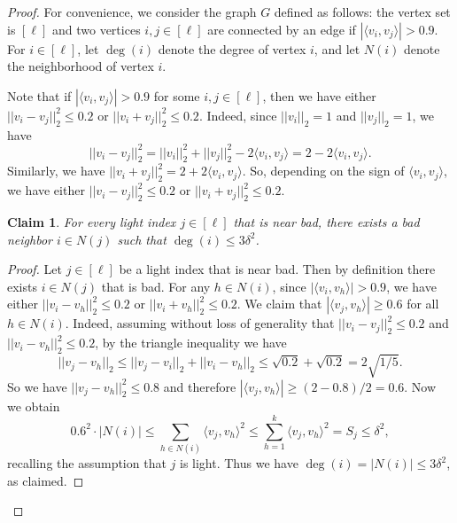 \documentclass[reqno]{amsart}
\newtheorem{claim}[theorem]{Claim}
\theoremstyle{remark}
\theoremstyle{definition}
\numberwithin{theorem}{section}
\renewcommand{\(}{\bigl(}
\renewcommand{\)}{\bigr)\vphantom{)}}
\renewcommand{\le}{\leqslant}
\renewcommand{\ge}{\geqslant}
\newcommand{\ang}[1]{\langle#1\rangle}
\begin{document}
\begin{proof}
    For convenience, we consider the graph $G$ defined as follows: the vertex set is $[\ell]$ and two vertices $i,j\in [\ell]$ are connected by an edge if $|\ang{v_i, v_j}| > 0.9$. For $i\in [\ell]$, let $\deg(i)$ denote the degree of vertex $i$, and let $N(i)$ denote the neighborhood of vertex $i$.
    
    Note that if $|\ang{v_i, v_j}| > 0.9$ for some $i,j\in [\ell]$, then we have either $||v_i-v_j||_2^2\le 0.2$ or $||v_i+v_j||_2^2\le 0.2$. Indeed, since $||v_i||_2 = 1$ and $||v_j||_2 = 1$, we have
    \[||v_i-v_j||_2^2 = ||v_i||_2^2 + ||v_j||_2^2 - 2\ang{v_i,v_j} = 2-2\ang{v_i,v_j}.\]
    Similarly, we have $||v_i+v_j||_2^2 = 2+2\ang{v_i,v_j}$. So, depending on the sign of $\ang{v_i,v_j}$, we have either $||v_i-v_j||_2^2\le 0.2$ or $||v_i+v_j||_2^2\le 0.2$.
    
    
    \begin{claim}\label{claim:light-bad-deg-bound}
        For every light index $j\in [\ell]$ that is near bad, there exists a bad neighbor $i\in N(j)$ such that $\deg(i)\le 3\delta^2$.
    \end{claim}

    \begin{proof}
        Let $j\in [\ell]$ be a light index that is near bad. Then by definition there exists $i\in N(j)$ that is bad. For any $h\in N(i)$, since $|\ang{v_i, v_h}| > 0.9$, we have either $||v_i- v_h||_2^2\le 0.2$ or $||v_i+v_h||_2^2\le 0.2$. We claim that $|\ang{v_j, v_h}|\ge 0.6$ for all $h\in  N(i)$. Indeed, assuming without loss of generality that $||v_i- v_j||_2^2\le 0.2$ and $||v_i- v_h||_2^2\le 0.2$,  by the triangle inequality we have
        \[||v_j-v_h||_2\le ||v_j- v_i||_2 + ||v_i- v_h||_2 \le \sqrt{0.2} + \sqrt{0.2} = 2\sqrt{1/5}.\]
        So we have $||v_j-v_h||_2^2\le 0.8$ and therefore $|\ang{v_j, v_h}|\ge (2-0.8)/2 = 0.6$. Now we obtain
        \[0.6^2\cdot |N(i)| \le\sum_{h\in N(i)} \ang{v_j, v_h}^2 \le \sum_{h = 1}^k \ang{v_j, v_h}^2 = S_j\le \delta^2,\]
        recalling the assumption that $j$ is light. Thus we have $\deg(i)=|N(i)|\le 3\delta^2$, as claimed.
    \end{proof}
    

\end{proof}
\end{document}
